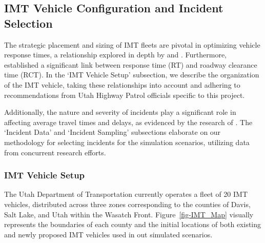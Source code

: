 \documentclass[
  letterpaper,
  authoryear]{elsarticle}
\begin{document}
\hypertarget{imt-vehicle-configuration-and-incident-selection}{%
\subsection{IMT Vehicle Configuration and Incident
Selection}\label{imt-vehicle-configuration-and-incident-selection}}

The strategic placement and sizing of IMT fleets are pivotal in
optimizing vehicle response times, a relationship explored in depth by
\citet{lou2011} and \citet{pal2002}. Furthermore, \citet{schultz2019}
established a significant link between response time (RT) and roadway
clearance time (RCT). In the `IMT Vehicle Setup' subsection, we describe
the organization of the IMT vehicle, taking these relationships into
account and adhering to recommendations from Utah Highway Patrol
officials specific to this project.

Additionally, the nature and severity of incidents play a significant
role in affecting average travel times and delays, as evidenced by the
research of \citet{kaddoura2018}. The `Incident Data' and `Incident
Sampling' subsections elaborate on our methodology for selecting
incidents for the simulation scenarios, utilizing data from concurrent
research efforts.

\hypertarget{imt-vehicle-setup}{%
\subsubsection{IMT Vehicle Setup}\label{imt-vehicle-setup}}

The Utah Department of Transportation currently operates a fleet of 20
IMT vehicles, distributed across three zones corresponding to the
counties of Davis, Salt Lake, and Utah within the Wasatch Front.
Figure~\ref{fig-IMT_Map} visually represents the boundaries of each
county and the initial locations of both existing and newly proposed IMT
vehicles used in out simulated scenarios.
\end{document}
